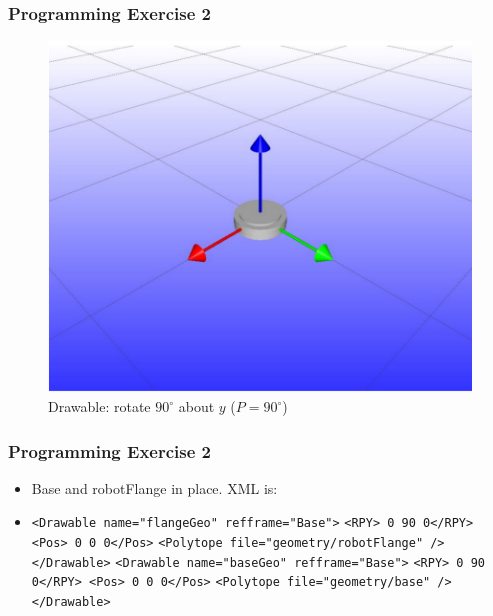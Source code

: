 \documentclass{beamer}
\begin{document}

\begin{frame}
  \frametitle{Programming Exercise 2}
  \begin{centering}
    \begin{figure}
    \includegraphics[height=0.6\textheight]{./graphics/ex33_3}
    \caption{Drawable: rotate $90^{\circ}$ about $y$ ($P = 90^{\circ}$)}
    \end{figure}
    \end{centering}
\end{frame}


\begin{frame}
  \frametitle{Programming Exercise 2}
  \begin{itemize}
  \item Base and robotFlange in place. XML is:
    \item \texttt{<Drawable name="flangeGeo" refframe="Base">} \newline
      \texttt{<RPY> 0 90 0</RPY> <Pos> 0 0 0</Pos>} \newline
      \texttt{<Polytope file="geometry/robotFlange" />}\newline
      \texttt{</Drawable>}\newline
      \texttt{<Drawable name="baseGeo" refframe="Base">}\newline
      \texttt{<RPY> 0 90 0</RPY> <Pos> 0 0 0</Pos>} \newline
      \texttt{<Polytope file="geometry/base" />} \newline
      \texttt{</Drawable>} 
    \end{itemize}
\end{frame}
\end{document}
